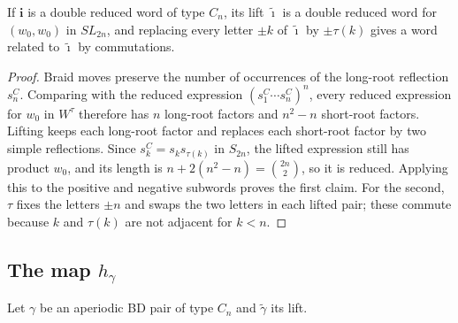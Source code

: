 \documentclass[a4paper]{amsart}
\numberwithin{equation}{section}
\theoremstyle{definition}
\theoremstyle{remark}
\newcommand{\bfi}{\mathbf{i}}
\newcommand{\tbfi}{\widetilde{\boldsymbol{\imath}}}
\newcommand{\tg}{\widetilde{\gamma}}
\newcommand{\SL}{SL_{2n}}
\begin{document}
\begin{lemma}
  \label{lem: lifted word}
  If $\bfi$ is a double reduced word of type $C_n$, its lift $\tbfi$ is a double reduced word for $(w_0,w_0)$ in $\SL$, and replacing every letter $\pm k$ of $\tbfi$ by $\pm\tau(k)$ gives a word related to $\tbfi$ by commutations.
\end{lemma}
\begin{proof}
  Braid moves preserve the number of occurrences of the long-root reflection $s_n^C$.
  Comparing with the reduced expression $(s_1^C\cdots s_n^C)^n$, every reduced expression for $w_0$ in $W^\tau$ therefore has $n$ long-root factors and $n^2-n$ short-root factors.
  Lifting keeps each long-root factor and replaces each short-root factor by two simple reflections.
  Since $s^C_k=s_ks_{\tau(k)}$ in $S_{2n}$, the lifted expression still has product $w_0$, and its length is $n+2(n^2-n)=\binom{2n}{2}$, so it is reduced.
  Applying this to the positive and negative subwords proves the first claim.
  For the second, $\tau$ fixes the letters $\pm n$ and swaps the two letters in each lifted pair; these commute because $k$ and $\tau(k)$ are not adjacent for $k<n$.
\end{proof}

\subsection{The map \texorpdfstring{$h_\gamma$}{h}}
Let $\gamma$ be an aperiodic BD pair of type $C_n$ and $\tg$ its lift.
\end{document}
